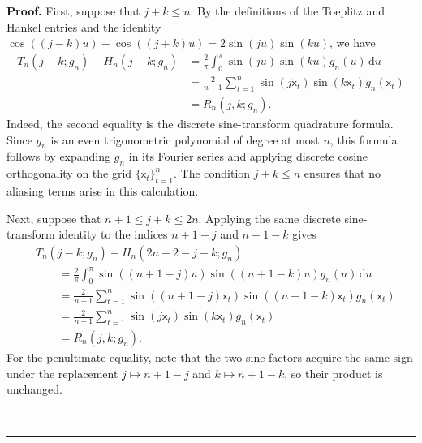 \documentclass[11pt]{article}
\newcommand{\sfx}{\mathsf{x}}
\newenvironment{proof}[1][Proof]{\noindent\textbf{#1.} }{\ \rule{0.5em}{0.5em}}
\numberwithin{equation}{section}
\numberwithin{figure}{section}
\begin{document}
\begin{proof}
%
%
First, suppose that \(j+k\leq n\). By the definitions of the Toeplitz and Hankel entries and the identity \(\cos((j-k)u)-\cos((j+k)u)=2\sin(ju)\sin(ku)\), we have
\begin{align*}
T_n(j-k;g_n)-H_n(j+k;g_n)
&=
\frac{2}{\pi}
\int_0^\pi
\sin(ju)\sin(ku)g_n(u)\,\mathrm{d}u \\
&=
\frac{2}{n+1}
\sum_{t=1}^{n}
\sin(j\sfx_t)\sin(k\sfx_t)g_n(\sfx_t) \\
&=
R_n(j,k;g_n).
\end{align*}
Indeed, the second equality is the discrete sine-transform quadrature formula. Since \(g_n\) is an even trigonometric polynomial of degree at most \(n\), this formula follows by expanding \(g_n\) in its Fourier series and applying discrete cosine orthogonality on the grid \(\{\sfx_t\}_{t=1}^n\). The condition \(j+k\leq n\) ensures that no aliasing terms arise in this calculation.




Next, suppose that \(n+1\leq j+k\leq 2n\). Applying the same discrete sine-transform identity to the indices \(n+1-j\) and \(n+1-k\) gives
\begin{align*}
&T_n(j-k;g_n)-H_n(2n+2-j-k;g_n) \\
&\qquad =
\frac{2}{\pi}
\int_0^\pi
\sin ((n+1-j)u)
\sin ((n+1-k)u)
g_n(u)\,\mathrm{d}u \\
&\qquad =
\frac{2}{n+1}
\sum_{t=1}^{n}
\sin ((n+1-j)\sfx_t)
\sin ((n+1-k)\sfx_t)
g_n(\sfx_t) \\
&\qquad =
\frac{2}{n+1}
\sum_{t=1}^{n}
\sin(j\sfx_t)\sin(k\sfx_t)g_n(\sfx_t) \\
&\qquad =
R_n(j,k;g_n).
\end{align*}
For the penultimate equality, note that the two sine factors acquire the same sign under the replacement \(j\mapsto n+1-j\) and \(k\mapsto n+1-k\), so their product is unchanged.


\end{proof}
\end{document}
